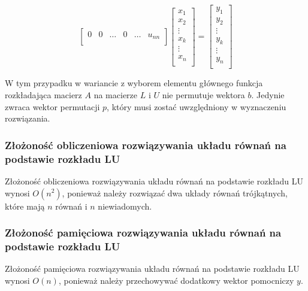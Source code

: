 \documentclass{article}
\begin{document}
\begin{center}
$$\begin{bmatrix}
        0 & 0 & \dots & 0 & \dots & u_{nn} \\
    \end{bmatrix}
    \begin{bmatrix}
        x_{1} \\
        x_{2} \\
        \vdots \\
        x_{k} \\
        \vdots \\
        x_{n} \\
    \end{bmatrix}
    =
    \begin{bmatrix}
        y_{1} \\
        y_{2} \\
        \vdots \\
        y_{k} \\
        \vdots \\
        y_{n} \\
    \end{bmatrix}
    $$
\end{center}

W tym przypadku w wariancie z wyborem elementu głównego funkcja rozkładająca macierz $A$ na macierze $L$ i $U$ nie permutuje wektora $b$. 
Jedynie zwraca wektor permutacji $p$, który musi zostać uwzględniony w wyznaczeniu rozwiązania.

\subsubsection{Złożoność obliczeniowa rozwiązywania układu równań na podstawie rozkładu LU}
Złożoność obliczeniowa rozwiązywania układu równań na podstawie rozkładu LU wynosi $O(n^2)$, ponieważ należy rozwiązać dwa układy równań trójkątnych, które mają $n$ równań i $n$ niewiadomych.
\subsubsection{Złożoność pamięciowa rozwiązywania układu równań na podstawie rozkładu LU}
Złożoność pamięciowa rozwiązywania układu równań na podstawie rozkładu LU wynosi $O(n)$, ponieważ należy przechowywać dodatkowy wektor pomocniczy $y$.
\end{document}
